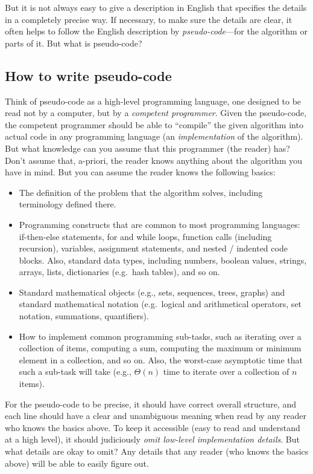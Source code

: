 \documentclass[11pt]{article}
\begin{document}
But it is not always easy to give a description in English that specifies the details in a completely precise way.
If necessary, to make sure the details are clear, it often helps to follow the English description by \emph{pseudo-code}---for the algorithm or parts of it.  But what is pseudo-code?

\subsection{How to write pseudo-code}\label{prelim: sec: pseudo-code}

Think of pseudo-code as a high-level programming language, one designed to be read not by a computer, but by a \emph{competent programmer}.  Given the pseudo-code, the competent programmer should be able to ``compile'' the given algorithm into actual code in any programming language (an \emph{implementation} of the algorithm).   
But what knowledge can you assume that this programmer (the reader) has?
Don't assume that, a-priori, the reader knows anything about the algorithm you have in mind.
But you can assume the reader knows the following basics:
\begin{itemize}
\item The definition of the problem that the algorithm solves, including terminology defined there.
\item Programming constructs that are common to most programming languages:
\textsf{if-then-else} statements, \textsf{for} and \textsf{while} loops, function calls (including recursion), variables, assignment statements, and nested / indented code blocks.  Also, standard data types, including numbers, boolean values, strings, arrays, lists, dictionaries (e.g.~hash tables), and so on.
\item Standard mathematical objects (e.g., sets, sequences, trees, graphs)
  and standard mathematical notation (e.g.~logical and arithmetical operators, set notation, summations, quantifiers).
\item How to implement common programming sub-tasks, such as iterating over a collection of items, computing a sum,
  computing the maximum or minimum element in a collection, and so on.  Also, the worst-case asymptotic time that such a sub-task will take (e.g., $\Theta(n)$ time to iterate over a collection of $n$ items).
\end{itemize}

For the pseudo-code to be precise, it should have correct overall structure, and each line should have a clear and unambiguous meaning when read by any reader who knows the basics above.   To keep it accessible (easy to read and understand at a high level), it should judiciously \emph{omit low-level implementation details}.  But what details are okay to omit?  Any details that any reader (who knows the basics above) will be able to easily figure out.
\end{document}
